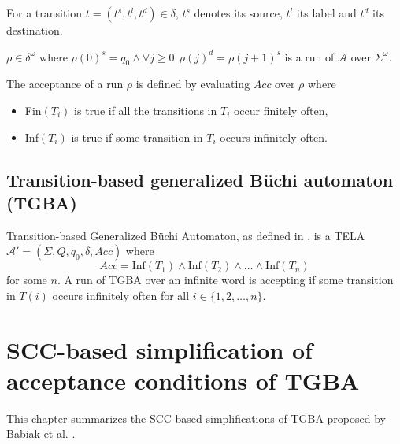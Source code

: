 \documentclass[
  digital, %
  twoside, %
  table,   %
  lof,     %
  lot,     %
]{fithesis3}
\begin{document}
For a transition $t = (t^s, t^l, t^d) \in \delta$, $t^s$ denotes its source, $t^l$ its label and $t^d$ its destination.

$\rho \in \delta^\omega$ where $\rho(0)^s = q_0 \wedge \forall j \geq 0 \colon \rho(j)^d = \rho(j + 1)^s$ is a run of $\mathcal{A}$ over $\Sigma^\omega$.

The acceptance of a run $\rho$ is defined by evaluating $Acc$ over $\rho$ where
\begin{itemize}
  \item Fin$(T_i)$ is true if all the transitions in $T_i$ occur finitely often, 
  \item Inf$(T_i)$ is true if some transition in $T_i$ occurs infinitely often.
\end{itemize}

\section{Transition-based generalized Büchi automaton (TGBA)}
\label{sec:tgba}
Transition-based Generalized Büchi Automaton, as defined in \cite{bloemen2017}, is a TELA $\mathcal{A'} = (\Sigma, Q, q_0, \delta, Acc)$ where 
\begin{equation*}
  Acc = \text{Inf}(T_1) \wedge \text{Inf}(T_2) \wedge \dots \wedge \text{Inf}(T_n)
\end{equation*} 
for some $n$. A run of TGBA over an infinite word is accepting if some transition in $T(i)$ occurs infinitely often for all $i \in \{1, 2, \dots, n\}$. 

\chapter{SCC-based simplification of acceptance conditions of TGBA} 
\label{chap:tgba_simpl}
This chapter summarizes the SCC-based simplifications of TGBA proposed by Babiak et al. \cite{spin2013}.
\end{document}
